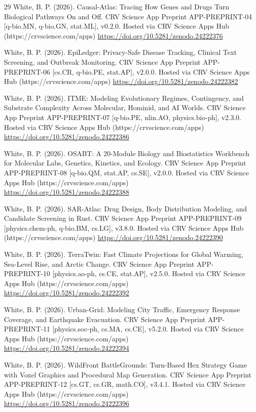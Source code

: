 \documentclass[10pt,letterpaper]{article}
\begin{document}
\begin{thebibliography}{29}
 White, B. P. (2026). Causal-Atlas: Tracing How Genes and Drugs Turn Biological Pathways On and Off. CRV Science App Preprint APP-PREPRINT-04 [q-bio.MN, q-bio.GN, stat.ML], v0.2.0. Hosted via CRV Science Apps Hub (https://crvscience.com/apps) \url{https://doi.org/10.5281/zenodo.24222376}

 White, B. P. (2026). EpiLedger: Privacy-Safe Disease Tracking, Clinical Text Screening, and Outbreak Monitoring. CRV Science App Preprint APP-PREPRINT-06 [cs.CR, q-bio.PE, stat.AP], v2.0.0. Hosted via CRV Science Apps Hub (https://crvscience.com/apps) \url{https://doi.org/10.5281/zenodo.24222382}

 White, B. P. (2026). ITME: Modeling Evolutionary Regimes, Contingency, and Substrate Complexity Across Molecular, Hominid, and AI Worlds. CRV Science App Preprint APP-PREPRINT-07 [q-bio.PE, nlin.AO, physics.bio-ph], v2.3.0. Hosted via CRV Science Apps Hub (https://crvscience.com/apps) \url{https://doi.org/10.5281/zenodo.24222386}

 White, B. P. (2026). OSABT: A 20-Module Biology and Biostatistics Workbench for Molecular Labs, Genetics, Kinetics, and Ecology. CRV Science App Preprint APP-PREPRINT-08 [q-bio.QM, stat.AP, cs.SE], v2.0.0. Hosted via CRV Science Apps Hub (https://crvscience.com/apps) \url{https://doi.org/10.5281/zenodo.24222388}

 White, B. P. (2026). SAR-Atlas: Drug Design, Body Distribution Modeling, and Candidate Screening in Rust. CRV Science App Preprint APP-PREPRINT-09 [physics.chem-ph, q-bio.BM, cs.LG], v3.8.0. Hosted via CRV Science Apps Hub (https://crvscience.com/apps) \url{https://doi.org/10.5281/zenodo.24222390}

 White, B. P. (2026). TerraTwin: Fast Climate Projections for Global Warming, Sea-Level Rise, and Arctic Change. CRV Science App Preprint APP-PREPRINT-10 [physics.ao-ph, cs.CE, stat.AP], v2.5.0. Hosted via CRV Science Apps Hub (https://crvscience.com/apps) \url{https://doi.org/10.5281/zenodo.24222392}

 White, B. P. (2026). Urban-Grid: Modeling City Traffic, Emergency Response Coverage, and Earthquake Evacuation. CRV Science App Preprint APP-PREPRINT-11 [physics.soc-ph, cs.MA, cs.CE], v5.2.0. Hosted via CRV Science Apps Hub (https://crvscience.com/apps) \url{https://doi.org/10.5281/zenodo.24222394}

 White, B. P. (2026). WildFront BattleGrounds: Turn-Based Hex Strategy Game with Voxel Graphics and Procedural Map Generation. CRV Science App Preprint APP-PREPRINT-12 [cs.GT, cs.GR, math.CO], v3.4.1. Hosted via CRV Science Apps Hub (https://crvscience.com/apps) \url{https://doi.org/10.5281/zenodo.24222396}


\end{thebibliography}
\end{document}
